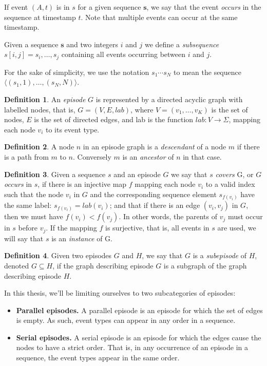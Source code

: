 \documentclass{scrartcl}
\theoremstyle{definition}
\newtheorem{definition}{Definition}
\begin{document}
If event $ (A, t) $ is in $ s $ for a given sequence $ \boldsymbol{s} $, we say that the event \emph{occurs} in the sequence at timestamp $ t $. Note that multiple events can occur at the same timestamp.

Given a sequence $ \boldsymbol{s} $ and two integers $ i $ and $ j $ we define a \emph{subsequence} $ s[i, j] = s_i, \ldots, s_j $ containing all events occurring between $ i $ and $ j $.

For the sake of simplicity, we use the notation $ s_1 \cdots s_N $ to mean the sequence $ \langle (s_1, 1), \ldots, (s_N, N) \rangle $.

\begin{definition}
An \emph{episode} $ G $ is represented by a directed acyclic graph with labelled nodes, that is, $ G = (V, E, lab) $, where $ V = (v_1, \ldots, v_K) $ is the set of nodes, $ E $ is the set of directed edges, and lab is the function $ lab \colon V \rightarrow \Sigma $, mapping each node $ v_i $ to its event type.
\end{definition}

\begin{definition}
A node $ n $ in an episode graph is a \emph{descendant} of a node $ m $ if there is a path from $ m $ to $ n $. Conversely $ m $ is an \emph{ancestor} of $ n $ in that case.
\end{definition}

\begin{definition}
Given a sequence $ s $ and an episode $ G $ we say that $ s $ \emph{covers} G, or $ G $ \emph{occurs} in $ s $, if there is an injective map $ f $ mapping each node $ v_i $ to a valid index such that the node $ v_i $ in $ G $ and the corresponding sequence element $ s_{f(v_i)} $ have the same label: $ s_{f(v_i)} = lab(v_i) $; and that if there is an edge $ (v_i, v_j) $ in $ G $, then we must have $ f(v_i) < f(v_j) $. In other words, the parents of $ v_j $ must occur in $ s $ before $ v_j $. If the mapping $ f $ is surjective, that is, all events in $ s $ are used, we will say that $ s $ is an \emph{instance} of G.
\end{definition}

\begin{definition}
Given two episodes $ G $ and $ H $, we say that $ G $ is a \emph{subepisode} of $ H $, denoted $ G \subseteq H $, if the graph describing episode $ G $ is a subgraph of the graph describing episode $ H $.
\end{definition}

In this thesis, we'll be limiting ourselves to two subcategories of episodes:
\begin{itemize}
\item \textbf{Parallel episodes.} A parallel episode is an episode for which the set of edges is empty. As such, event types can appear in any order in a sequence.
\item \textbf{Serial episodes.} A serial episode is an episode for which the edges cause the nodes to have a strict order. That is, in any occurrence of an episode in a sequence, the event types appear in the same order.
\end{itemize}
\end{document}
